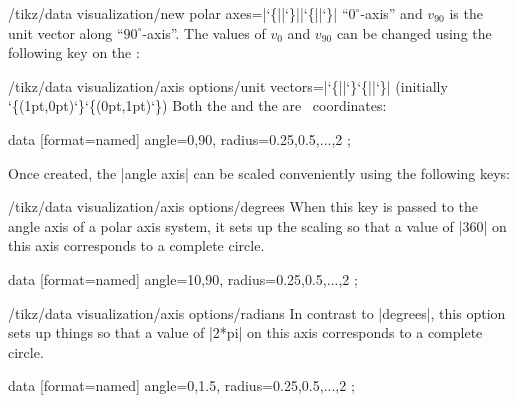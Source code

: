\begin{key}{/tikz/data visualization/new polar axes=|\char`\{||\char`\}||\char`\{||\char`\}|}
  ``$0^\circ$-axis'' and $v_{90}$ is the unit vector along
  ``$90^\circ$-axis''. The values of $v_0$ and $v_{90}$ can be changed
  using the following key on the :
  \begin{key}{/tikz/data visualization/axis options/unit
      vectors=|\char`\{||\char`\}\char`\{||\char`\}| (initially {\char`\{(1pt,0pt)\char`\}\char`\{(0pt,1pt)\char`\}})}
    Both the  and the  are \tikzname\ coordinates:
\begin{codeexample}[]
\tikz \datavisualization
    [new polar axes={angle axis}{radius axis},
     radius axis={unit length=1cm},
     angle axis={unit vectors={(10:1pt)}{(60:1pt)}},
     visualize as scatter]
  data [format=named] {
    angle={0,90}, radius={0.25,0.5,...,2}
  };
\end{codeexample}    
  \end{key}
\end{key}

Once created, the |angle axis| can be scaled conveniently using the
following keys:

\begin{key}{/tikz/data visualization/axis options/degrees}
  When this key is passed to the angle axis of a polar axis system, it
  sets up the scaling so that a value of |360| on this axis
  corresponds to a complete circle.
\begin{codeexample}[]
\tikz \datavisualization
    [new polar axes={angle axis}{radius axis},
     radius axis={unit length=1cm},
     angle axis={degrees},
     visualize as scatter]
  data [format=named] {
    angle={10,90}, radius={0.25,0.5,...,2}
  };
\end{codeexample}    
\end{key}

\begin{key}{/tikz/data visualization/axis options/radians}
  In contrast to |degrees|, this option sets up things so that a value
  of |2*pi| on this axis corresponds to a complete circle.
\begin{codeexample}[]
\tikz \datavisualization
    [new polar axes={angle axis}{radius axis},
     radius axis={unit length=1cm},
     angle axis={radians},
     visualize as scatter]
  data [format=named] {
    angle={0,1.5}, radius={0.25,0.5,...,2}
  };
\end{codeexample}
\end{key}



